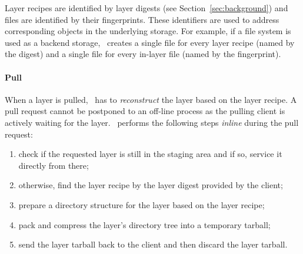 %
%
Layer recipes are identified by layer digests (see Section~\ref{sec:background})
and files are identified by their fingerprints.
%
These identifiers are used to address corresponding objects in the
underlying storage.
%
For example, if a file system is used as a backend storage, \sysname\ creates a
single file for every layer recipe (named by the digest) and a single file for
every in-layer file (named by the fingerprint).


\paragraph{Pull}
%
When a layer is pulled, \sysname\ has to \emph{reconstruct} the layer based
on the layer recipe.
%
A pull request cannot be postponed to an off-line process as the
pulling client is actively waiting for the layer.
%
\sysname\ performs the following steps \emph{inline} during the pull request:
%
\begin{enumerate}
  \item check if the requested layer is still in the staging area and if so,
	service it directly from there;
  \item otherwise, find the layer recipe by the layer digest
	provided by the client;
  \item prepare a directory structure for the layer based on the layer recipe;
  \item pack and compress the layer's directory tree into a temporary tarball;
  \item send the layer tarball back to the client and then discard the layer tarball.
\end{enumerate}
